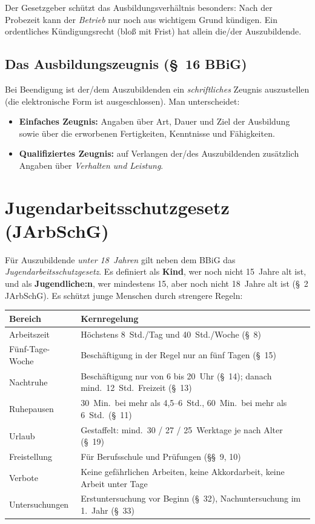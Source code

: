 \documentclass[11pt, a4paper]{article}
\begin{document}
\begin{merksatz}
Der Gesetzgeber schützt das Ausbildungsverhältnis besonders: Nach der Probezeit kann der
\emph{Betrieb} nur noch aus wichtigem Grund kündigen. Ein ordentliches Kündigungsrecht (bloß
mit Frist) hat allein die/der Auszubildende.
\end{merksatz}

\subsection{Das Ausbildungszeugnis (\S~16 BBiG)}

Bei Beendigung ist der/dem Auszubildenden ein \emph{schriftliches} Zeugnis auszustellen (die
elektronische Form ist ausgeschlossen). Man unterscheidet:

\begin{itemize}
  \item \textbf{Einfaches Zeugnis:} Angaben über Art, Dauer und Ziel der Ausbildung sowie über
    die erworbenen Fertigkeiten, Kenntnisse und Fähigkeiten.
  \item \textbf{Qualifiziertes Zeugnis:} auf Verlangen der/des Auszubildenden zusätzlich
    Angaben über \emph{Verhalten und Leistung}.
\end{itemize}

\section{Jugendarbeitsschutzgesetz (JArbSchG)}

Für Auszubildende \emph{unter 18~Jahren} gilt neben dem BBiG das
\emph{Jugendarbeitsschutzgesetz}. Es definiert als \textbf{Kind}, wer noch nicht 15~Jahre alt
ist, und als \textbf{Jugendliche:n}, wer mindestens 15, aber noch nicht 18~Jahre alt ist
(\S~2 JArbSchG). Es schützt junge Menschen durch strengere Regeln:

\begin{center}
\begin{tabular}{p{4.8cm} p{7.8cm}}
\toprule
\textbf{Bereich} & \textbf{Kernregelung}\\
\midrule
Arbeitszeit & Höchstens 8~Std./Tag und 40~Std./Woche (\S~8)\\
Fünf-Tage-Woche & Beschäftigung in der Regel nur an fünf Tagen (\S~15)\\
Nachtruhe & Beschäftigung nur von 6 bis 20~Uhr (\S~14); danach mind.\ 12~Std.\ Freizeit (\S~13)\\
Ruhepausen & 30~Min.\ bei mehr als 4,5--6~Std., 60~Min.\ bei mehr als 6~Std.\ (\S~11)\\
Urlaub & Gestaffelt: mind.\ 30 / 27 / 25~Werktage je nach Alter (\S~19)\\
Freistellung & Für Berufsschule und Prüfungen (\S\S~9, 10)\\
Verbote & Keine gefährlichen Arbeiten, keine Akkordarbeit, keine Arbeit unter Tage\\
Untersuchungen & Erstuntersuchung vor Beginn (\S~32), Nachuntersuchung im 1.\ Jahr (\S~33)\\
\bottomrule
\end{tabular}
\end{center}
\end{document}
